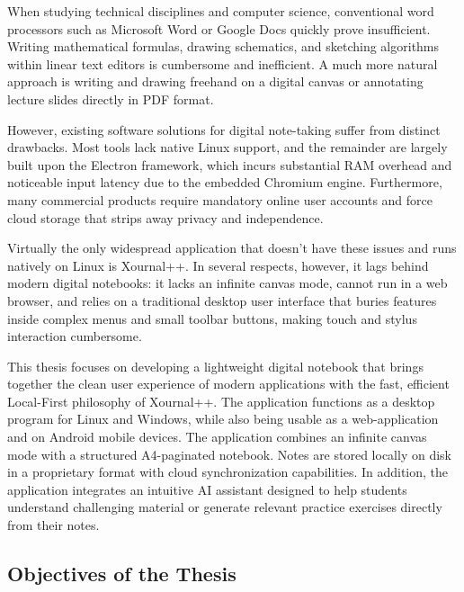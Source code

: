 \documentclass[12pt, a4paper, oneside]{article}
\begin{document}
When studying technical disciplines and computer science, conventional word processors such as Microsoft Word or Google Docs quickly prove insufficient. Writing mathematical formulas, drawing schematics, and sketching algorithms within linear text editors is cumbersome and inefficient. A much more natural approach is writing and drawing freehand on a digital canvas or annotating lecture slides directly in PDF format.

However, existing software solutions for digital note-taking suffer from distinct drawbacks. Most tools lack native Linux support, and the remainder are largely built upon the Electron framework, which incurs substantial RAM overhead and noticeable input latency due to the embedded Chromium engine. Furthermore, many commercial products require mandatory online user accounts and force cloud storage that strips away privacy and independence.

Virtually the only widespread application that doesn't have these issues and runs natively on Linux is Xournal++. In several respects, however, it lags behind modern digital notebooks: it lacks an infinite canvas mode, cannot run in a web browser, and relies on a traditional desktop user interface that buries features inside complex menus and small toolbar buttons, making touch and stylus interaction cumbersome.

This thesis focuses on developing a lightweight digital notebook that brings together the clean user experience of modern applications with the fast, efficient Local-First philosophy of Xournal++. The application functions as a desktop program for Linux and Windows, while also being usable as a web-application and on Android mobile devices. The application combines an infinite canvas mode with a structured A4-paginated notebook. Notes are stored locally on disk in a proprietary format with cloud synchronization capabilities. In addition, the application integrates an intuitive AI assistant designed to help students understand challenging material or generate relevant practice exercises directly from their notes.

\subsection{Objectives of the Thesis}
\label{sec:cile_prace}
\end{document}
